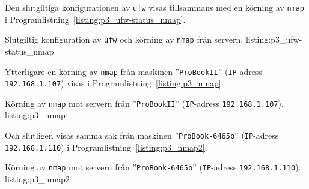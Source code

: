Den slutgiltiga konfigurationen av \texttt{ufw} visas tillsammans med en
körning av \texttt{nmap} i Programlistning~\ref{listing:p3_ufw-status_nmap}.

            {Slutgiltig konfiguration av \texttt{ufw} och körning av 
             \texttt{nmap} från servern.}
            {listing:p3_ufw-status_nmap}

Ytterligare en körning av \texttt{nmap} från maskinen ''\texttt{ProBookII}''
(\texttt{IP}-adress \texttt{192.168.1.107}) visas i
Programlistning~\ref{listing:p3_nmap}.

            {Körning av \texttt{nmap} mot servern från ''\texttt{ProBookII}''
             (\texttt{IP}-adress \texttt{192.168.1.107}).}
            {listing:p3_nmap}

Och slutligen visas samma sak från maskinen ''\texttt{ProBook-6465b}''
(\texttt{IP}-adress \texttt{192.168.1.110}) i
Programlistning~\ref{listing:p3_nmap2}.

            {Körning av \texttt{nmap} mot servern från ''\texttt{ProBook-6465b}''
             (\texttt{IP}-adress \texttt{192.168.1.110}).}
            {listing:p3_nmap2}
